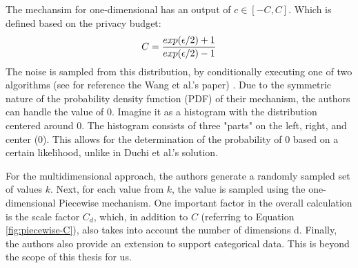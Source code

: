 The mechansim for one-dimensional has an output of $c \in [-C, C]$.
Which is defined based on the privacy budget:
\begin{equation}
    C = \frac{exp(\epsilon/2)+1}{exp(\epsilon/2) - 1} \\
    \label{fig:piecewise-C}
\end{equation}
The noise is sampled from this distribution, by conditionally executing one of two algorithms (see for reference the Wang et al.'s paper) \citep{wang_collecting_2019}.
Due to the symmetric nature of the probability density function (PDF) of their mechanism, the authors can handle the value of 0.
Imagine it as a histogram with the distribution centered around 0.
The histogram consists of three "parts" on the left, right, and center (0).
This allows for the determination of the probability of 0 based on a certain likelihood, unlike in Duchi et al.'s solution.

For the multidimensional approach, the authors generate a randomly sampled set of values $k$.
Next, for each value from $k$, the value is sampled using the one-dimensional Piecewise mechanism.
One important factor in the overall calculation is the scale factor $C_d$, which, in addition to $C$ (referring to Equation \ref{fig:piecewise-C}), also takes into account the number of dimensions d.
Finally, the authors also provide an extension to support categorical data.
This is beyond the scope of this thesis for us.



